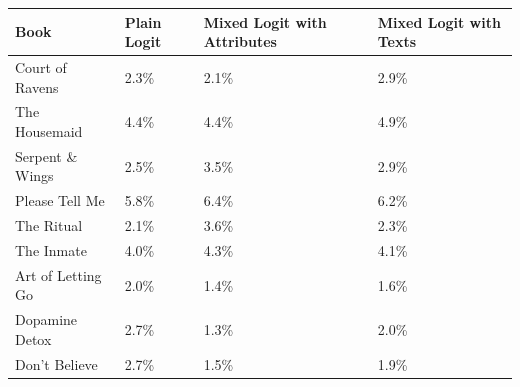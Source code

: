 \begin{centering}
\begin{tabular}{>{\raggedright}p{5cm}>{\raggedright}p{2cm}>{\centering}p{2cm}>{\centering}p{2cm}}
\hline
{\footnotesize\textbf{Book}} & {\footnotesize\textbf{Plain Logit}} & {\footnotesize\textbf{Mixed Logit with Attributes}} & {\footnotesize\textbf{Mixed Logit with Texts}}\tabularnewline
\hline
{\footnotesize Court of Ravens} & {\footnotesize 2.3\%} & {\footnotesize 2.1\%} & {\footnotesize 2.9\%}\tabularnewline
{\footnotesize The Housemaid} & {\footnotesize 4.4\%} & {\footnotesize 4.4\%} & {\footnotesize 4.9\%}\tabularnewline
{\footnotesize Serpent \& Wings} & {\footnotesize 2.5\%} & {\footnotesize 3.5\%} & {\footnotesize 2.9\%}\tabularnewline
{\footnotesize Please Tell Me} & {\footnotesize 5.8\%} & {\footnotesize 6.4\%} & {\footnotesize 6.2\%}\tabularnewline
{\footnotesize The Ritual} & {\footnotesize 2.1\%} & {\footnotesize 3.6\%} & {\footnotesize 2.3\%}\tabularnewline
{\footnotesize The Inmate} & {\footnotesize 4.0\%} & {\footnotesize 4.3\%} & {\footnotesize 4.1\%}\tabularnewline
{\footnotesize Art of Letting Go} & {\footnotesize 2.0\%} & {\footnotesize 1.4\%} & {\footnotesize 1.6\%}\tabularnewline
{\footnotesize Dopamine Detox} & {\footnotesize 2.7\%} & {\footnotesize 1.3\%} & {\footnotesize 2.0\%}\tabularnewline
{\footnotesize Don't Believe} & {\footnotesize 2.7\%} & {\footnotesize 1.5\%} & {\footnotesize 1.9\%}\tabularnewline
\hline
\end{tabular}
\par\end{centering}